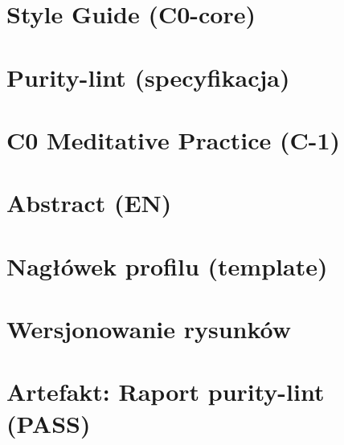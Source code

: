 \documentclass[11pt,a4paper]{article}
\begin{document}
\section{Style Guide (C0-core)}

\section{Purity-lint (specyfikacja)}

\section{C0 Meditative Practice (C-1)}

\section*{Abstract (EN)}

\appendix
\section{Nagłówek profilu (template)}
\section{Wersjonowanie rysunków}
\section*{Artefakt: Raport purity-lint (PASS)}
\end{document}
